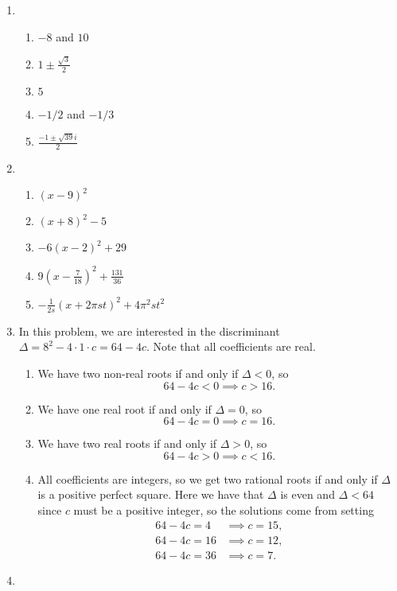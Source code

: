\begin{enumerate}
\item \begin{enumerate}
\item $-8$ and $10$
\item $1\pm\frac{\sqrt{3}}{2}$
\item $5$
\item $-1/2$ and $-1/3$
\item $\frac{-1\pm\sqrt{39}i}{2}$
\end{enumerate}
\item \begin{enumerate}
\item $(x - 9)^2$
\item $(x + 8)^2 - 5$
\item $-6(x - 2)^2 + 29$
\item $\displaystyle 9\left(x - \frac{7}{18}\right)^2 + \frac{131}{36}$
\item $\displaystyle -\frac{1}{2s}(x + 2\pi st)^2 + 4\pi^2 st^2$
\end{enumerate}
\item In this problem, we are interested in the discriminant $\Delta = 8^2 - 4\cdot 1\cdot c = 64 - 4c$. Note that all coefficients are real.
\begin{enumerate}
\item We have two non-real roots if and only if $\Delta < 0$, so
\begin{equation*}
64 - 4c < 0\implies\boxed{c > 16}.
\end{equation*}
\item We have one real root if and only if $\Delta = 0$, so 
\begin{equation*}
64 - 4c = 0\implies\boxed{c = 16}.
\end{equation*}
\item We have two real roots if and only if $\Delta > 0$, so
\begin{equation*}
64 - 4c > 0\implies\boxed{c < 16}.
\end{equation*}
\item All coefficients are integers, so we get two rational roots if and only if $\Delta$ is a positive perfect square. Here we have that $\Delta$ is even and $\Delta < 64$ since $c$ must be a positive integer, so the solutions come from setting
\begin{align*}
64 - 4c = 4 &\implies c = \boxed{15}, \\
64 - 4c = 16 &\implies c = \boxed{12}, \\
64 - 4c = 36 & \implies c = \boxed{7}.
\end{align*}
\end{enumerate}
\item 
\end{enumerate}